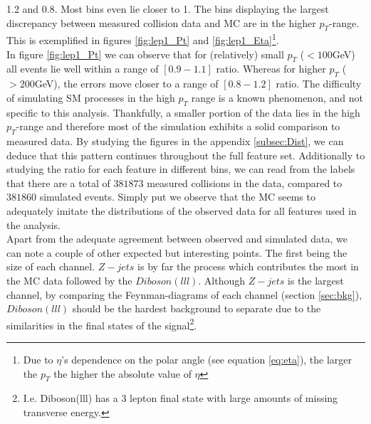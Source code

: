 1.2 and 0.8. Most bins even lie closer to 1. The bins displaying the largest discrepancy between measured collision data and \ac{MC} are 
in the higher $p_T$-range. This is exemplified in figures \ref{fig:lep1_Pt} and \ref{fig:lep1_Eta}\footnote{Due to $\eta$'s dependence on the
polar angle (see equation \ref{eq:eta}), the larger the $p_T$ the higher the absolute value of $\eta$}. 
\\
In figure \ref{fig:lep1_Pt} we can observe that for (relatively) small $p_T$ ($<100$GeV) all events lie well within a range of $[0.9-1.1]$ ratio. 
Whereas for higher $p_T$ ($>200$GeV), the errors move closer to a range of $[0.8-1.2]$ ratio. The difficulty of simulating \ac{SM} processes 
in the high $p_T$ range is a known phenomenon, and not specific to this analysis. Thankfully, a smaller portion of the data lies in the high $p_T$-range
and therefore most of the simulation exhibits a solid comparison to measured data. By studying the figures in the appendix \ref{subsec:Dist}, 
we can deduce that this pattern continues throughout the full feature set. Additionally to studying the ratio for each feature in different bins,
we can read from the labels that there are a total of $381873$ measured collisions in the data, compared to $381860$ simulated events.
Simply put we observe that the \ac{MC} seems to adequately imitate the distributions of the observed data for all features used in the analysis. 
\\
Apart from the adequate agreement between observed and simulated data, we can note a couple of other expected
but interesting points. The first being the size of each channel. $Z-jets$ is by far the process which contributes the most in the \ac{MC} data
followed by the $Diboson (lll)$. Although $Z-jets$ is the largest channel, by comparing the Feynman-diagrams of each channel
(section \ref{sec:bkg}), $Diboson(lll)$ should be the hardest background to separate due to the similarities in the 
final states of the signal\footnote{I.e. Diboson(lll) has a 3 lepton final state with large amounts of missing transverse energy.}. 
